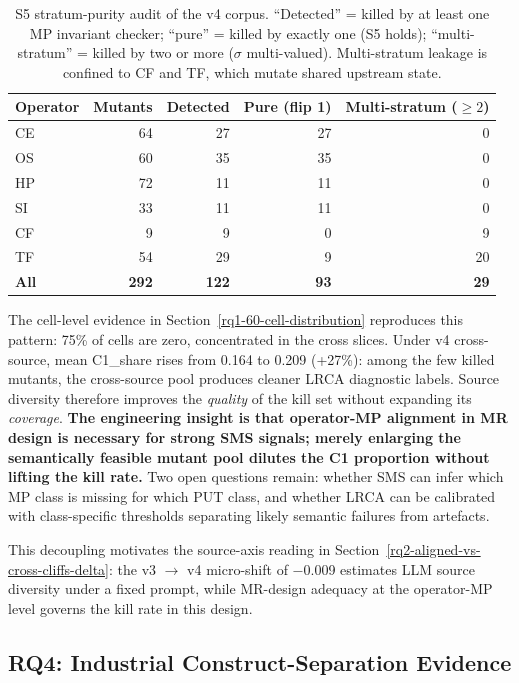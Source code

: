 \documentclass[manuscript,screen,review]{acmart}
\begin{document}
{%
\begin{longtable}[]{@{}lrrrr@{}}
\caption{S5 stratum-purity audit of the v4 corpus. ``Detected'' = killed
by at least one MP invariant checker; ``pure'' = killed by exactly one
(S5 holds); ``multi-stratum'' = killed by two or more ($\sigma$
multi-valued). Multi-stratum leakage is confined to CF and TF, which
mutate shared upstream state.}\label{tab:s5-purity}\\
\toprule\noalign{}
Operator & Mutants & Detected & Pure (flip 1) & Multi-stratum ($\ge 2$) \\
\midrule\noalign{}
\endfirsthead
\endhead
\bottomrule\noalign{}
\endlastfoot
CE & 64 & 27 & 27 & 0 \\
OS & 60 & 35 & 35 & 0 \\
HP & 72 & 11 & 11 & 0 \\
SI & 33 & 11 & 11 & 0 \\
CF & 9 & 9 & 0 & 9 \\
TF & 54 & 29 & 9 & 20 \\
\textbf{All} & \textbf{292} & \textbf{122} & \textbf{93} & \textbf{29} \\
\end{longtable}
}

The cell-level evidence in Section~\ref{rq1-60-cell-distribution} reproduces this pattern: 75\% of cells
are zero, concentrated in the cross slices. Under v4 cross-source, mean
C1\_share rises from 0.164 to 0.209 (+27\%): among the few killed
mutants, the cross-source pool produces cleaner LRCA diagnostic labels.
Source diversity therefore improves the \emph{quality} of the kill set
without expanding its \emph{coverage}. \textbf{The engineering insight is that
operator-MP alignment in MR design is necessary for strong SMS signals;
merely enlarging the semantically feasible mutant pool dilutes the C1
proportion without lifting the kill rate.} Two open questions remain:
whether SMS can infer which MP class is missing for which PUT class, and
whether LRCA can be calibrated with class-specific thresholds separating
likely semantic failures from artefacts.

This decoupling motivates the source-axis reading in Section~\ref{rq2-aligned-vs-cross-cliffs-delta}: the v3 $\to$
v4 micro-shift of $-$0.009 estimates LLM source diversity under a fixed
prompt, while MR-design adequacy at the operator-MP level governs the
kill rate in this design.

\subsection{RQ4: Industrial Construct-Separation Evidence}\label{rq4-industrial-construct-separation}
\end{document}
